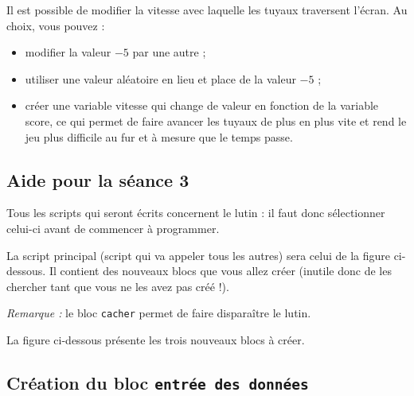 

Il est possible de modifier la vitesse avec laquelle les tuyaux traversent l'écran. Au choix, vous pouvez :
\begin{itemize}
\item modifier la valeur $-5$ par une autre ;
\item utiliser une valeur aléatoire en lieu et place de la valeur $-5$ ;
\item créer une variable vitesse qui change de valeur en fonction de la variable score, ce qui permet de faire avancer les tuyaux de plus en plus vite et rend le jeu plus difficile au fur et à mesure que le temps passe.
\end{itemize}



\subsection{Aide pour la séance 3}\label{aide_seanceScratch3}


Tous les scripts qui seront écrits concernent le lutin : il faut donc sélectionner celui-ci avant de commencer à programmer.

\vspace{6pt}

La script principal (script qui va appeler tous les autres) sera celui de la figure ci-dessous. Il contient des nouveaux blocs que vous allez créer (inutile donc de les chercher tant que vous ne les avez pas créé !).


\emph{Remarque :} le bloc \texttt{cacher} permet de faire disparaître le lutin.

\vspace{6pt}

La figure ci-dessous présente les trois nouveaux blocs à créer.




\subsection{Création du bloc \texttt{entrée des données}}

